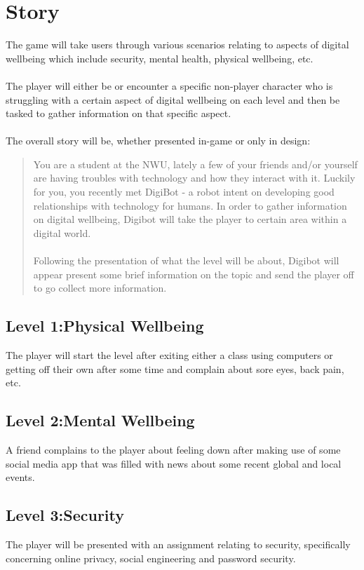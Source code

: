 \documentclass[a4paper]{scrreprt}
\begin{document}
\section{Story}
The game will take users through various scenarios relating to aspects of digital wellbeing which include security, mental health, physical wellbeing, etc.
\\\\
The player will either be or encounter a specific non-player character who is struggling with a certain aspect of digital wellbeing on each level and then be tasked to gather information on that specific aspect.
\\\\
The overall story will be, whether presented in-game or only in design:
\begin{quote}
You are a student at the NWU, lately a few of your friends and/or yourself are having troubles with technology and how they interact with it. Luckily for you, you recently met DigiBot - a robot intent on developing good relationships with technology for humans. In order to gather information on digital wellbeing, Digibot will take the player to certain area within a digital world.
\\\\
Following the presentation of what the level will be about, Digibot will appear present some brief information on the topic and send the player off to go collect more information.
\end{quote} 

\subsection{Level 1:Physical Wellbeing}
The player will start the level after exiting either a class using computers or getting off their own after some time and complain about sore eyes, back pain, etc. 

\subsection{Level 2:Mental Wellbeing}
A friend complains to the player about feeling down after making use of some social media app that was filled with news about some recent global and local events. 

\subsection{Level 3:Security}
The player will be presented with an assignment relating to security, specifically concerning online privacy, social engineering and password security. 
\end{document}
